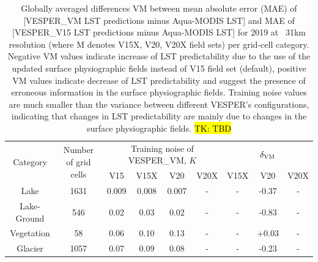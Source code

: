 \documentclass[hess, twostagejnl]{copernicus}
\begin{document}
\begin{table}
	\begin{tabular}{ccccccccc}
		\hline
		\multirow{2}{*}{Category} & \multirow{2}{*}{Number of grid cells} & 	\multicolumn{4}{c}{Training noise of VESPER\_VM, $K$} &\multicolumn{3}{c}{$\delta_{\rm VM}$} \\  
		&&V15  & V15X & V20 & V20X & V15X &V20 & V20X  \\
		\hline 
		Lake&1631&0.009 & 0.008 & 0.007 & - &- &-0.37 & -  \\
		Lake-Ground&546&0.02 & 0.03 & 0.02 & - &- &-0.83 & -  \\
		Vegetation&58&0.06 & 0.10 & 0.13 & - & -&+0.03 & -  \\
		Glacier&1057& 0.07& 0.09 & 0.08 & - &-&-0.23  & -  \\
		\bottomrule
	\end{tabular}
	\caption{Globally averaged differences VM between mean absolute error (MAE) of [VESPER\_VM LST predictions minus Aqua-MODIS LST] and MAE of [VESPER\_V15 LST predictions minus Aqua-MODIS LST] for 2019 at ~31km resolution (where M denotes V15X, V20, V20X field sets) per grid-cell category. Negative VM values indicate increase of LST predictability due to the use of the updated surface physiographic fields instead of V15 field set (default), positive VM values indicate decrease of LST predictability and suggest the presence of erroneous information in the surface physiographic fields. Training noise values are much smaller than the variance between different VESPER’s configurations, indicating that changes in LST predictability are mainly due to changes in the surface physiographic fields. \hl{TK: TBD}}
	\label{tab:categorisation}
\end{table}
\end{document}
